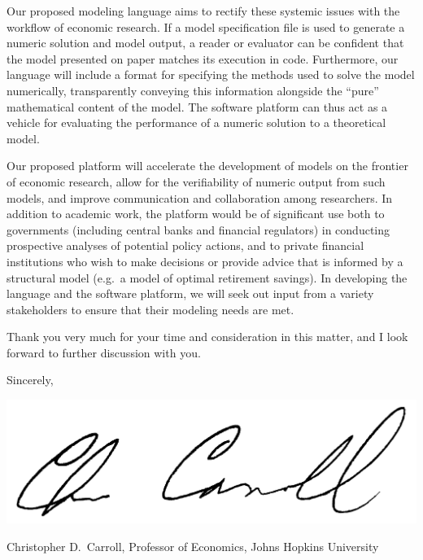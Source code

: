 \documentclass[11pt,pdftex,letterpaper]{article}
\begin{document}
Our proposed modeling language aims to rectify these systemic issues with the workflow of economic research. If a model specification file is used to generate a numeric solution and model output, a reader or evaluator can be confident that the model presented on paper matches its execution in code. Furthermore, our language will include a format for specifying the methods used to solve the model numerically, transparently conveying this information alongside the ``pure'' mathematical content of the model. The software platform can thus act as a vehicle for evaluating the performance of a numeric solution to a theoretical model.

Our proposed platform will accelerate the development of models on the frontier of economic research, allow for the verifiability of numeric output from such models, and improve communication and collaboration among researchers. In addition to academic work, the platform would be of significant use both to governments (including central banks and financial regulators) in conducting prospective analyses of potential policy actions, and to private financial institutions who wish to make decisions or provide advice that is informed by a structural model (e.g.\ a model of optimal retirement savings). In developing the language and the software platform, we will seek out input from a variety stakeholders to ensure that their modeling needs are met.

Thank you very much for your time and consideration in this matter, and I look forward to further discussion with you.

\vspace{0.5cm}

{\parskip=2pt Sincerely,

  \includegraphics[scale=0.7]{CDCsignature.jpg}
  
Christopher D.\ Carroll, Professor of Economics, Johns Hopkins University}
\end{document}
